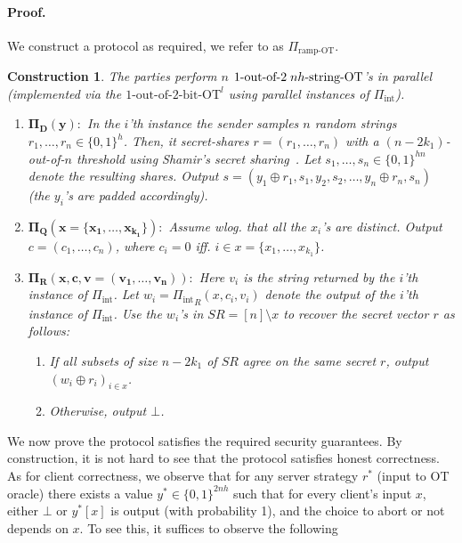 \documentclass[a4paper]{article}
\newtheorem{construction}{Construction}
\newcommand{\OT}[2]{#1\text{-out-of-}#2\text{-bit-OT}}
\newcommand{\sOT}[3]{#1\text{-out-of-}#2\text{\;$#3$-string-OT}}
\newcommand{\INT}{\Pi_{\text{int}}}
\begin{document}
\paragraph{Proof.} We construct a protocol as required, we refer to as $\Pi_{\text{ramp-OT}}$.

\begin{construction}
	The parties perform $n$ $\sOT{1}{2}{nh}$'s in parallel (implemented via the ${\OT{1}{2}}^l$ using parallel instances of $\INT$).  
		\begin{enumerate} 
			\item $\mathbf{\Pi_D(y):}$ In the $i$'th instance the sender samples $n$ random strings $r_1,\ldots,r_n\in\{0,1\}^h$. Then, it secret-shares $r=(r_1,\ldots,r_n)$ with a $(n-2k_1)$-out-of-$n$ threshold using Shamir's secret sharing~\cite{Shamir79}. Let $s_1,\ldots,s_n\in \{0,1\}^{hn}$ denote the resulting shares. Output $s = (y_1\oplus r_1,s_1,y_2,s_2,\ldots,y_n\oplus r_n,s_n)$ (the $y_i$'s are padded accordingly).
			\item $\mathbf{\Pi_Q(x=\{x_1,\ldots,x_{k_1}\}):}$ Assume wlog. that all the $x_i$'s are distinct. Output $c=(c_1,\ldots,c_n)$, where $c_i=0$ iff. $i\in x = \{x_1,\ldots,x_{k_1}\}$.
			\item $\mathbf{\Pi_R(x,c,v=(v_1,\ldots,v_n)):}$ Here $v_i$ is the string returned by the $i$'th instance of $\INT$.
			Let $w_i = {\INT}_R(x,c_i,v_i)$ denote the output of the $i$'th instance of $\INT$. Use the $w_i$'s in $SR=[n]\setminus{x}$ to recover the secret vector $r$ as follows:
		\begin{enumerate}
		 \item If all subsets of size $n-2k_1$ of $SR$ agree on the same secret $r$, output $(w_i\oplus r_i)_{i\in x}$. 
		 \item Otherwise, output $\bot$.   
		\end{enumerate}
	\end{enumerate}
\end{construction}


We now prove the protocol satisfies the required security guarantees.
By construction, it is not hard to see that the protocol satisfies honest correctness. As for client correctness, we observe that for any server strategy $r^*$ (input to OT oracle) there exists a value $y^*\in\{0,1\}^{2nh}$ such that for every client's input $x$, 
either $\bot$ or $y^*[x]$ is output (with probability 1), and the choice to abort or not depends on $x$. To see this, it suffices to observe the following
\end{document}
